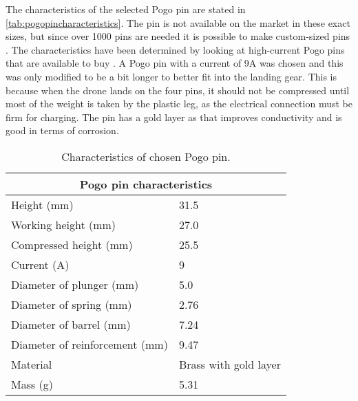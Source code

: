 The characteristics of the selected Pogo pin are stated in \autoref{tab:pogopincharacteristics}. The pin is not available on the market in these exact sizes, but since over 1000 pins are needed it is possible to make custom-sized pins \cite{pogopin}.
The characteristics have been determined by looking at high-current Pogo pins that are available to buy \cite{millmaxpogo}. A Pogo pin with a current of 9A was chosen and this was only modified to be a bit longer to better fit into the landing gear. This is because when the drone lands on the four pins, it should not be compressed until most of the weight is taken by the plastic leg, as the electrical connection must be firm for charging. The pin has a gold layer as that improves conductivity and is good in terms of corrosion. \cite{pogopin}

\begin{table}[h]
\centering
\caption{Characteristics of chosen Pogo pin.}
\label{tab:pogopincharacteristics}
\begin{small}
\begin{tabular}{|l|l|}
\hline
\multicolumn{2}{|c|}{\textbf{Pogo pin characteristics}}         \\ \hline
Height (mm)                    & 31.5                  \\ \hline
Working height (mm)            & 27.0                    \\ \hline
Compressed height (mm)         & 25.5                  \\ \hline
Current (A)                    & 9                     \\ \hline
Diameter of plunger (mm)       & 5.0                     \\ \hline
Diameter of spring (mm)        & 2.76                \\ \hline
Diameter of barrel (mm)        & 7.24                \\ \hline
Diameter of reinforcement (mm) & 9.47                \\ \hline
Material                       & Brass with gold layer \\ \hline
Mass (g)                       & 5.31                \\ \hline
\end{tabular}
\end{small}
\end{table}




